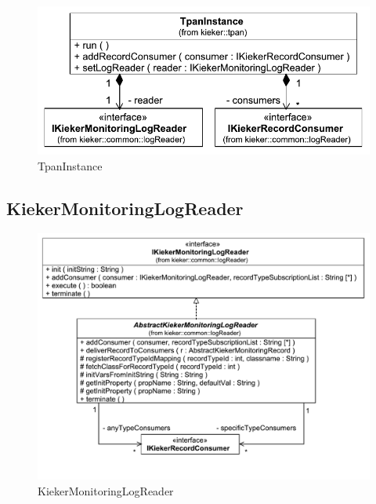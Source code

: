 \documentclass[12pt,journal,a4paper,twocolumn,final,oneside]{IEEEtran}%
\begin{document}
\begin{figure}[h]\centering
\includegraphics[scale=0.55]{figures/model/kieker_TpanInstance}%
\caption{TpanInstance}
\end{figure}

\subsection{KiekerMonitoringLogReader}

\begin{figure}[h]\centering
\includegraphics[scale=0.55]{figures/model/kieker_KiekerMonitoringLogReader}%
\caption{KiekerMonitoringLogReader}
\end{figure}
\end{document}
